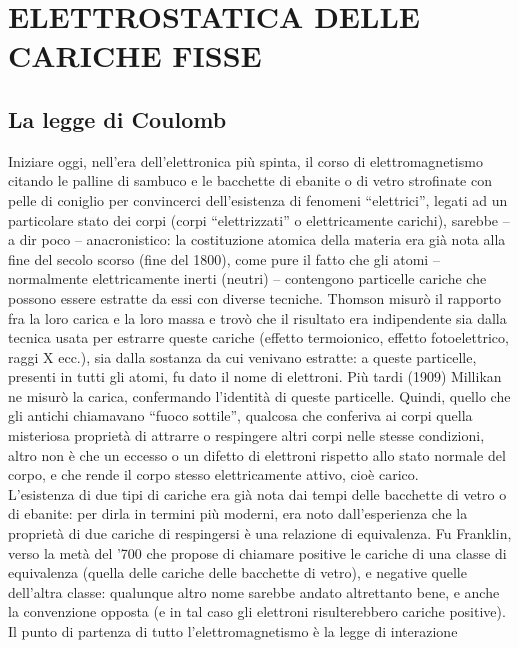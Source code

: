 \section{ELETTROSTATICA DELLE CARICHE FISSE}

\subsection{La legge di Coulomb}

Iniziare oggi, nell'era dell'elettronica pi\`u spinta, il corso di
elettromagnetismo citando le palline di sambuco e le bacchette di ebanite o di
vetro strofinate con pelle di coniglio per convincerci dell'esistenza di
fenomeni ``elettrici'', legati ad un particolare stato dei corpi (corpi
``elettrizzati'' o elettricamente carichi), sarebbe -- a dir poco --
anacronistico: la costituzione atomica della materia era gi\`a nota alla fine
del secolo scorso (fine del 1800), come pure il fatto che gli atomi --
normalmente elettricamente inerti (neutri) -- contengono particelle cariche che
possono essere estratte da essi con diverse tecniche. Thomson misur\`o il
rapporto fra la loro carica e la loro massa e trov\`o che il risultato era
indipendente sia dalla tecnica usata per estrarre queste cariche (effetto
termoionico, effetto fotoelettrico, raggi X ecc.), sia dalla sostanza da cui
venivano estratte: a queste particelle, presenti in tutti gli atomi, fu dato il
nome di elettroni. Pi\`u tardi (1909) Millikan ne misur\`o la carica,
confermando l'identit\`a di queste particelle. Quindi, quello che gli antichi
chiamavano ``fuoco sottile'', qualcosa che conferiva ai corpi quella misteriosa
propriet\`a di attrarre o respingere altri corpi nelle stesse condizioni, altro
non \`e che un eccesso o un difetto di elettroni rispetto allo stato normale del
corpo, e che rende il corpo stesso elettricamente attivo, cio\`e carico.\\
L'esistenza di due tipi di cariche era gi\`a nota dai tempi delle bacchette di
vetro o di ebanite: per dirla in termini pi\`u moderni, era noto dall'esperienza
che la propriet\`a di due cariche di respingersi \`e una relazione di
equivalenza. Fu Franklin, verso la met\`a del '700 che propose di chiamare
positive le cariche di una classe di equivalenza (quella delle cariche delle
bacchette di vetro), e negative quelle dell'altra classe: qualunque altro nome
sarebbe andato altrettanto bene, e anche la convenzione opposta (e in tal caso
gli elettroni risulterebbero cariche positive).\\
Il punto di partenza di tutto l'elettromagnetismo \`e la legge di interazione
